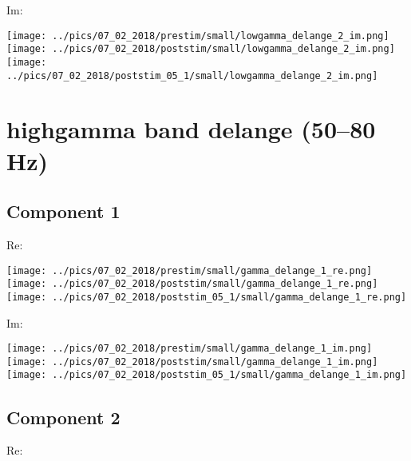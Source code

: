 \documentclass{article}
\begin{document}
Im:

\hspace{0.5cm}
\texttt{[image: ../pics/07\_02\_2018/prestim/small/lowgamma\_delange\_2\_im.png]}
\hspace{0.5cm}
\texttt{[image: ../pics/07\_02\_2018/poststim/small/lowgamma\_delange\_2\_im.png]}
\hspace{0.5cm}
\texttt{[image: ../pics/07\_02\_2018/poststim\_05\_1/small/lowgamma\_delange\_2\_im.png]}

\section{highgamma band delange (50--80 Hz)}
\subsection*{Component 1}
Re:

\hspace{0.5cm}
\texttt{[image: ../pics/07\_02\_2018/prestim/small/gamma\_delange\_1\_re.png]}
\hspace{0.5cm}
\texttt{[image: ../pics/07\_02\_2018/poststim/small/gamma\_delange\_1\_re.png]}
\hspace{0.5cm}
\texttt{[image: ../pics/07\_02\_2018/poststim\_05\_1/small/gamma\_delange\_1\_re.png]}

Im:

\hspace{0.5cm}
\texttt{[image: ../pics/07\_02\_2018/prestim/small/gamma\_delange\_1\_im.png]}
\hspace{0.5cm}
\texttt{[image: ../pics/07\_02\_2018/poststim/small/gamma\_delange\_1\_im.png]}
\hspace{0.5cm}
\texttt{[image: ../pics/07\_02\_2018/poststim\_05\_1/small/gamma\_delange\_1\_im.png]}

\subsection*{Component 2}
Re:
\end{document}
